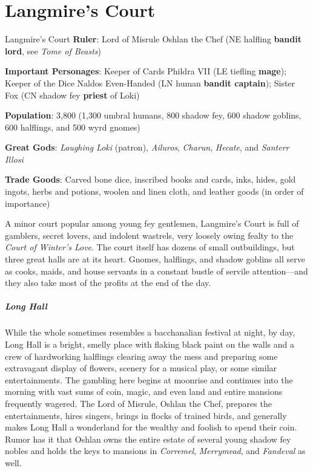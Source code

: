 \documentclass[10pt,a4paper,twoside,bg=print,twocolumn,openany,nodeprecatedcode]{dndbook}
\begin{document}
\section{Langmire's Court}
\begin{DndSidebar}[float=!b]{Langmire's Court}
\textbf{Ruler}: Lord of Misrule Oshlan the Chef (NE halfling \textbf{bandit lord}, see \textit{Tome of Beasts})



\textbf{Important Personages}: Keeper of Cards Phildra VII (LE tiefling \textbf{mage}); Keeper of the Dice Naldos Even-Handed (LN human \textbf{bandit captain}); Sister Fox (CN shadow fey \textbf{priest} of Loki)



\textbf{Population}: 3,800 (1,300 umbral humans, 800 shadow fey, 600 shadow goblins, 600 halflings, and 500 wyrd gnomes)



\textbf{Great Gods}: \textit{Laughing Loki} (patron), \textit{Ailuros}, \textit{Charun}, \textit{Hecate}, and \textit{Santerr Illosi}



\textbf{Trade Goods}: Carved bone dice, inscribed books and cards, inks, hides, gold ingots, herbs and potions, woolen and linen cloth, and leather goods (in order of importance)





\end{DndSidebar}

A minor court popular among young fey gentlemen, Langmire's Court is full of gamblers, secret lovers, and indolent wastrels, very loosely owing fealty to the \textit{Court of Winter's Love}. The court itself has dozens of small outbuildings, but three great halls are at its heart. Gnomes, halflings, and shadow goblins all serve as cooks, maids, and house servants in a constant bustle of servile attention—and they also take most of the profits at the end of the day.

\subparagraph{Long Hall}
While the whole sometimes resembles a bacchanalian festival at night, by day, Long Hall is a bright, smelly place with flaking black paint on the walls and a crew of hardworking halflings clearing away the mess and preparing some extravagant display of flowers, scenery for a musical play, or some similar entertainments. The gambling here begins at moonrise and continues into the morning with vast sums of coin, magic, and even land and entire mansions frequently wagered. The Lord of Misrule, Oshlan the Chef, prepares the entertainments, hires singers, brings in flocks of trained birds, and generally makes Long Hall a wonderland for the wealthy and foolish to spend their coin. Rumor has it that Oshlan owns the entire estate of several young shadow fey nobles and holds the keys to mansions in \textit{Corremel}, \textit{Merrymead}, and \textit{Fandeval} as well.
\end{document}
